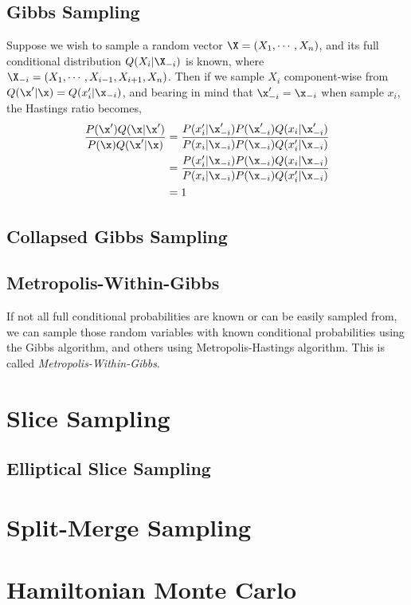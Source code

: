 \documentclass{book}
\begin{document}
\subsection{Gibbs Sampling}
Suppose we wish to sample a random vector $\X = (X_1,\cdots,X_n)$, and its full conditional distribution $Q(X_i|\X_{-i})$ is known, where $\X_{-i} = (X_1,\cdots,X_{i-1},X_{i+1},X_n)$. Then if we sample $X_i$ component-wise from $Q(\x'|\x) = Q(x_i'|\x_{-i})$, and bearing in mind that $\x'_{-i} = \x_{-i}$ when sample $x_i$, the Hastings ratio becomes,
\begin{align}
	\frac{P(\x')Q(\x|\x')}{P(\x)Q(\x'|\x)} &= \frac{P(x_i'|\x'_{-i})P(\x'_{-i})Q(x_i|\x'_{-i})}{P(x_i|\x_{-i})P(\x_{-i})Q(x_i'|\x_{-i})}\\
	&= \frac{P(x_i'|\x_{-i})P(\x_{-i})Q(x_i|\x_{-i})}{P(x_i|\x_{-i})P(\x_{-i})Q(x_i'|\x_{-i})}\\	
	&= 1
\end{align}

\subsection{Collapsed Gibbs Sampling}

\subsection{Metropolis-Within-Gibbs}
If not all full conditional probabilities are known or can be easily sampled from, we can sample those random variables with known conditional probabilities using the Gibbs algorithm, and others using Metropolis-Hastings algorithm. This is called {\em{Metropolis-Within-Gibbs}}.

\section{Slice Sampling}
\subsection{Elliptical Slice Sampling}

\section{Split-Merge Sampling}

\section{Hamiltonian Monte Carlo}
\end{document}
